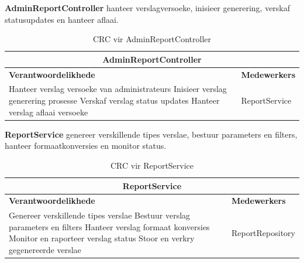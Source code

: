 \vspace{1em}
\textbf{AdminReportController} hanteer verslagversoeke, inisieer generering, verskaf statusupdates en hanteer aflaai.
\begin{table}[H]\centering\begin{tabular}{|p{}|p{}|}
    \hline
    \multicolumn{2}{|c|}{\textbf{AdminReportController}} \\
    \hline
    \textbf{Verantwoordelikhede} & \textbf{Medewerkers} \\
    \hline
    Hanteer verslag versoeke van administrateurs \newline
    Inisieer verslag generering prosesse \newline
    Verskaf verslag status updates \newline
    Hanteer verslag aflaai versoeke
    &
    ReportService \\
    \hline
\end{tabular}
\caption{CRC vir AdminReportController}
\label{tab:crc_admin_report_controller}
\end{table}

\vspace{1em}
\textbf{ReportService} genereer verskillende tipes verslae, bestuur parameters en filters, hanteer formaatkonversies en monitor status.
\begin{table}[H]\centering\begin{tabular}{|p{}|p{}|}
    \hline
    \multicolumn{2}{|c|}{\textbf{ReportService}} \\
    \hline
    \textbf{Verantwoordelikhede} & \textbf{Medewerkers} \\
    \hline
    Genereer verskillende tipes verslae \newline
    Bestuur verslag parameters en filters \newline
    Hanteer verslag formaat konversies \newline
    Monitor en raporteer verslag status \newline
    Stoor en verkry gegenereerde verslae
    &
    ReportRepository \\
    \hline
\end{tabular}
\caption{CRC vir ReportService}
\label{tab:crc_report_service}
\end{table}

